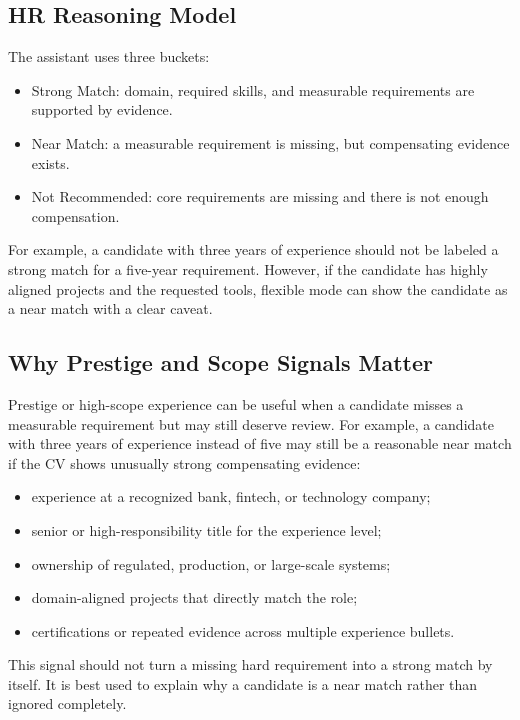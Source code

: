\documentclass[11pt]{article}
\begin{document}
\subsection{HR Reasoning Model}

The assistant uses three buckets:

\begin{itemize}[leftmargin=*]
  \item Strong Match: domain, required skills, and measurable requirements are supported by evidence.
  \item Near Match: a measurable requirement is missing, but compensating evidence exists.
  \item Not Recommended: core requirements are missing and there is not enough compensation.
\end{itemize}

For example, a candidate with three years of experience should not be labeled a strong match for a five-year requirement. However, if the candidate has highly aligned projects and the requested tools, flexible mode can show the candidate as a near match with a clear caveat.

\subsection{Why Prestige and Scope Signals Matter}

Prestige or high-scope experience can be useful when a candidate misses a measurable requirement but may still deserve review. For example, a candidate with three years of experience instead of five may still be a reasonable near match if the CV shows unusually strong compensating evidence:

\begin{itemize}[leftmargin=*]
  \item experience at a recognized bank, fintech, or technology company;
  \item senior or high-responsibility title for the experience level;
  \item ownership of regulated, production, or large-scale systems;
  \item domain-aligned projects that directly match the role;
  \item certifications or repeated evidence across multiple experience bullets.
\end{itemize}

This signal should not turn a missing hard requirement into a strong match by itself. It is best used to explain why a candidate is a near match rather than ignored completely.
\end{document}

